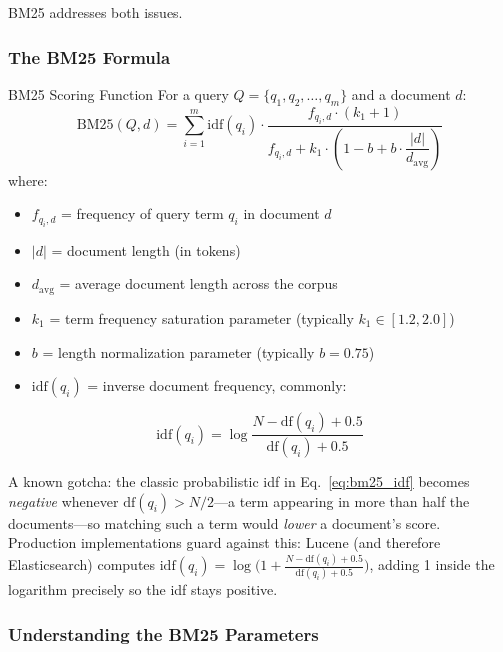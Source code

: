 BM25 addresses both issues.

\subsubsection{The BM25 Formula}

\begin{mathresult}{BM25 Scoring Function}
For a query $Q = \{q_1, q_2, \ldots, q_m\}$ and a document $d$:
\begin{equation}
    \text{BM25}(Q, d) = \sum_{i=1}^{m} \text{idf}(q_i) \cdot \frac{f_{q_i, d} \cdot (k_1 + 1)}{f_{q_i, d} + k_1 \cdot \left(1 - b + b \cdot \dfrac{|d|}{d_{\text{avg}}}\right)}
    \label{eq:bm25}
\end{equation}
where:
\begin{itemize}[itemsep=4pt]
    \item $f_{q_i, d}$ = frequency of query term $q_i$ in document $d$
    \item $|d|$ = document length (in tokens)
    \item $d_{\text{avg}}$ = average document length across the corpus
    \item $k_1$ = term frequency saturation parameter (typically $k_1 \in [1.2, 2.0]$)
    \item $b$ = length normalization parameter (typically $b = 0.75$)
    \item $\text{idf}(q_i)$ = inverse document frequency, commonly:
\end{itemize}
\begin{equation}
    \text{idf}(q_i) = \log \frac{N - \text{df}(q_i) + 0.5}{\text{df}(q_i) + 0.5}
    \label{eq:bm25_idf}
\end{equation}
\end{mathresult}

\begin{warningbox}
A known gotcha: the classic probabilistic idf in Eq.~\eqref{eq:bm25_idf} becomes
\emph{negative} whenever $\text{df}(q_i) > N/2$---a term appearing in more than half the
documents---so matching such a term would \emph{lower} a document's score. Production
implementations guard against this: Lucene (and therefore Elasticsearch) computes
$\text{idf}(q_i) = \log\bigl(1 + \frac{N - \text{df}(q_i) + 0.5}{\text{df}(q_i) + 0.5}\bigr)$,
adding 1 inside the logarithm precisely so the idf stays positive.
\end{warningbox}

\subsubsection{Understanding the BM25 Parameters}

